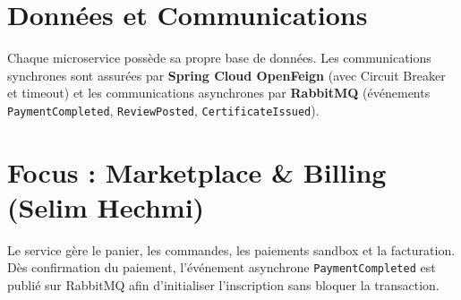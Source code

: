 \documentclass[11pt,a4paper]{article}
\begin{document}
\section{Données et Communications}
Chaque microservice possède sa propre base de données. Les communications synchrones sont assurées par \textbf{Spring Cloud OpenFeign} (avec Circuit Breaker et timeout) et les communications asynchrones par \textbf{RabbitMQ} (événements \texttt{PaymentCompleted}, \texttt{ReviewPosted}, \texttt{CertificateIssued}).

\section{Focus : Marketplace \& Billing (Selim Hechmi)}
Le service gère le panier, les commandes, les paiements sandbox et la facturation. Dès confirmation du paiement, l'événement asynchrone \texttt{PaymentCompleted} est publié sur RabbitMQ afin d'initialiser l'inscription sans bloquer la transaction.
\end{document}
